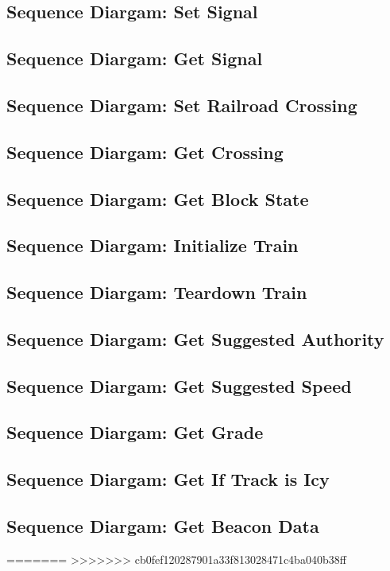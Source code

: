 \documentclass{scrreprt}
\begin{document}
\subsection{Sequence Diargam: Set Signal}

\subsection{Sequence Diargam: Get Signal}

\subsection{Sequence Diargam: Set Railroad Crossing}

\subsection{Sequence Diargam: Get Crossing}

\subsection{Sequence Diargam: Get Block State}

\subsection{Sequence Diargam: Initialize Train}

\subsection{Sequence Diargam: Teardown Train}

\subsection{Sequence Diargam: Get Suggested Authority}

\subsection{Sequence Diargam: Get Suggested Speed}

\subsection{Sequence Diargam: Get Grade}

\subsection{Sequence Diargam: Get If Track is Icy}

\subsection{Sequence Diargam: Get Beacon Data}

=======
>>>>>>> cb0fef120287901a33f813028471c4ba040b38ff
\end{document}
